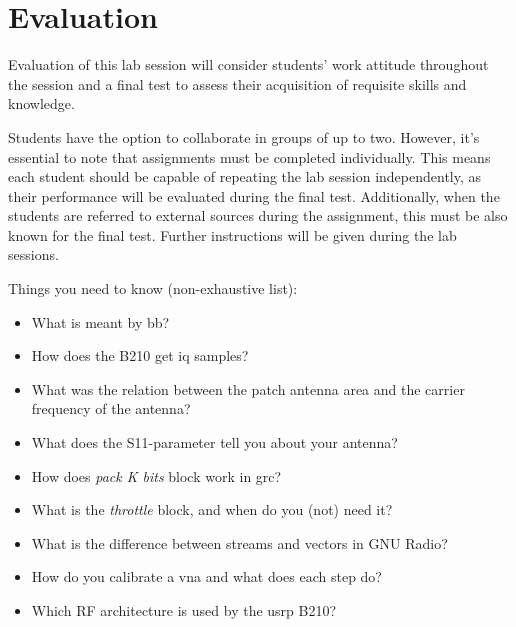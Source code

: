 \chapter{Evaluation}\glsresetall

Evaluation of this lab session will consider students' work attitude throughout the session and a final test to assess their acquisition of requisite skills and knowledge.

Students have the option to collaborate in groups of up to two. However, it's essential to note that assignments must be completed individually. This means each student should be capable of repeating the lab session independently, as their performance will be evaluated during the final test. Additionally, when the students are referred to external sources during the assignment, this must be also known for the final test.
Further instructions will be given during the lab sessions.

Things you need to know (non-exhaustive list):
\begin{itemize}
    \item What is meant by \gls{bb}?
    \item How does the B210 get \gls{iq} samples?
    \item What was the relation between the patch antenna area and the carrier frequency of the antenna?
    \item What does the S11-parameter tell you about your antenna?
    \item How does \textit{pack K bits} block work in \gls{grc}?
    \item What is the \textit{throttle} block, and when do you (not) need it?
    \item What is the difference between streams and vectors in GNU Radio?
    \item How do you calibrate a \gls{vna} and what does each step do?
    \item Which RF architecture is used by the \gls{usrp} B210?
\end{itemize}
